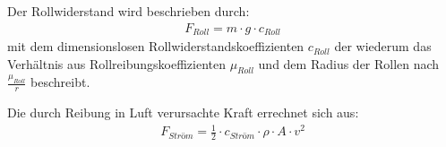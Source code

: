 	Der Rollwiderstand wird beschrieben durch:
	\begin{align}
		F_{Roll} = m \cdot g \cdot c_{Roll}
		\label{eq:rolling resistance}
	\end{align}
	mit dem dimensionslosen Rollwiderstandskoeffizienten \(c_{Roll}\) der wiederum das Verhältnis aus Rollreibungskoeffizienten \(\mu_{Roll}\) und dem Radius der Rollen nach \(\frac{\mu_{Roll}}{r}\) beschreibt.\par\medskip
	
	Die durch Reibung in Luft verursachte Kraft errechnet sich aus:
	\begin{align}
		F_{Ström} = \frac{1}{2} \cdot c_{Ström} \cdot \rho \cdot A \cdot v^2
		\label{eq:air drag}
	\end{align}

